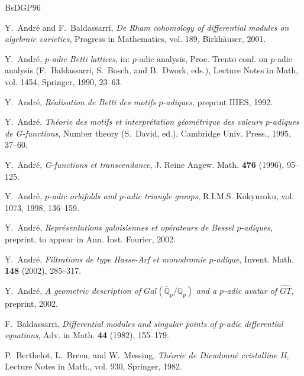 \newcommand{\noop}[1]{}\newcommand{\mathcalbigd}{{\mathcal
  D}}\newcommand{\bfbigq}{{\bf Q}}\newcommand{\bfbigz}{{\bf Z}}
\providecommand{\bysame}{\leavevmode\hbox to3em{\hrulefill}\thinspace}
\begin{thebibliography}{BsDGP96}

Y.~Andr\'e and F.~Baldassarri, \emph{De {R}ham cohomology of differential
  modules on algebraic varieties}, Progress in Mathematics, vol. 189,
  Birkh\"auser, 2001.

Y.~Andr\'e, \emph{$p$-adic {B}etti lattices}, in: $p$-adic analysis, Proc.
  Trento conf. on $p$-adic analysis (F.~Baldassarri, S.~Bosch, and B.~Dwork,
  eds.), Lecture Notes in Math, vol. 1454, Springer, 1990, 23--63.

Y.~Andr\'e, \emph{R\'ealisation de {B}etti des motifs $p$-adiques}, preprint
  IHES, 1992.

Y.~Andr\'e, \emph{Th\'eorie des motifs et interpr\'etation g\'eom\'etrique des
  valeurs $p$-adiques de {G}-functions}, Number theory (S.~David, ed.),
  Cambridge Univ. Press., 1995, 37--60.

Y.~Andr\'e, \emph{{G}-functions et transcendance}, J. Reine Angew. Math.
  \textbf{476} (1996), 95--125.

Y.~Andr\'e, \emph{$p$-adic orbifolds and $p$-adic triangle groups}, R.I.M.S.
  Kokyuroku, vol. 1073, 1998, 136--159.

Y.~Andr\'e, \emph{Repr\'esentations galoisiennes et op\'erateurs de {B}essel
  $p$-adiques}, preprint, to appear in Ann. Inst. Fourier, 2002.

Y.~Andr\'e, \emph{Filtrations de type Hasse-Arf et monodromie $p$-adique},
  Invent. Math. \textbf{148} (2002), 285--317.

Y.~Andr\'e, \emph{A geometric description of} 
  $Gal(\overline{\mathbb{Q}}_p/\mathbb{Q}_p)$  \emph{and a $p$-adic avatar of  $\hat{GT}$, }
 preprint, 2002.

F.~Baldassarri, \emph{Differential modules and singular points of $p$-adic
  differential equations}, Adv. in Math. \textbf{44} (1982), 155--179.

P.~Berthelot, L.~Breen, and W.~Messing, \emph{Th\'eorie de {D}ieudonn\'e
  cristalline {I}{I}}, Lecture Notes in Math., vol. 930, Springer, 1982.


\end{thebibliography}
